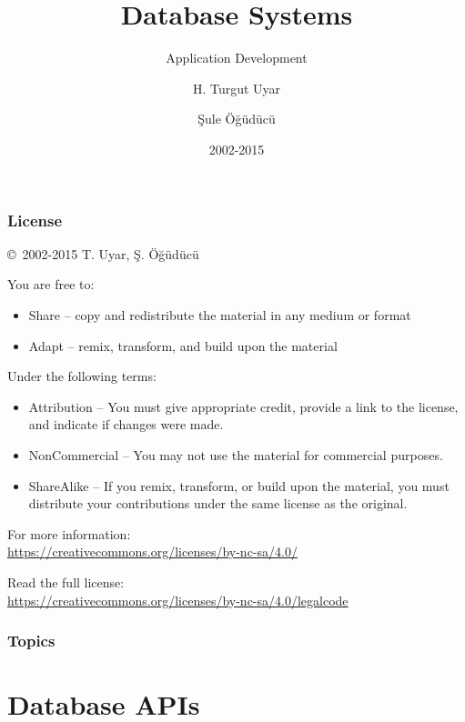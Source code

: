 \documentclass[dvipsnames]{beamer}
\title{Database Systems}
\subtitle{Application Development}
\author{H. Turgut Uyar \and Şule Öğüdücü}
\date{2002-2015}
\theoremstyle{plain}
\begin{document}
\begin{frame}
  \titlepage
\end{frame}

\begin{frame}
  \frametitle{License}

  \hfill
  \copyright~2002-2015 T. Uyar, Ş. Öğüdücü

  \vfill
  \begin{footnotesize}
    You are free to:
    \begin{itemize}
      \itemsep0em
      \item Share -- copy and redistribute the material in any medium or format
      \item Adapt -- remix, transform, and build upon the material
    \end{itemize}

    Under the following terms:
    \begin{itemize}
      \itemsep0em
      \item Attribution -- You must give appropriate credit, provide a link to
        the license, and indicate if changes were made.

      \item NonCommercial -- You may not use the material for commercial
        purposes.

      \item ShareAlike -- If you remix, transform, or build upon the material,
        you must distribute your contributions under the same license as the
        original.
    \end{itemize}
  \end{footnotesize}

  \begin{small}
    For more information:\\
    \url{https://creativecommons.org/licenses/by-nc-sa/4.0/}

    \smallskip
    Read the full license:\\
    \url{https://creativecommons.org/licenses/by-nc-sa/4.0/legalcode}
  \end{small}
\end{frame}

\begin{frame}
  \frametitle{Topics}
  \tableofcontents
\end{frame}

\lstset{language=Python3}

\section{Database APIs}
\end{document}
